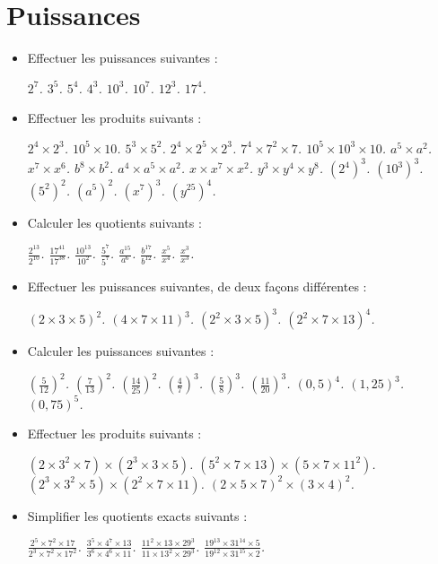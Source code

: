 \chapter{Puissances}
 
 \begin{itemize}
 \item Effectuer les puissances suivantes : \begin{itemize}
 \it $2^7$.
 \it $3^5$. 
 \it $5^4$. 
 \it $4^3$.
 \it $10^3$. 
 \it $10^7$. 
 \it $12^3$. 
 \it $17^4$. 
 \end{itemize}
 \item Effectuer les produits suivants : \begin{itemize}
 \it $2^4\times 2^3$.
 \it $10^5\times 10$. 
 \it $5^3\times 5^2$. 
 \it $2^4\times2^5\times2^3$.
 \it $7^4\times7^2\times7$.
 \it $10^5\times 10^3\times 10$. 
 \it $a^5\times a^2$.  
 \it $x^7\times x^6$. 
 \it $b^8\times b^2$. 
 \it $a^4\times a^5\times a^2$. 
 \it $x\times x^7\times x^2$. 
 \it $y^3\times y^4\times y^8$. 
 \it $(2^4)^3$.
 \it $(10^3)^3$.
 \it $(5^2)^2$. 
 \it $(a^5)^2$.
 \it $(x^7)^3$. 
 \it $(y^{25})^4$.
\end{itemize}  
\item Calculer les quotients suivants : \begin{itemize}
\it $\frac{2^{13}}{2^{10}}$.
\it $\frac{17^{41}}{17^{38}}$.
\it $\frac{10^{13}}{10^2}$. 
\it $\frac{5^7}{5^7}$. 
\it $\frac{a^{15}}{a^6}$.
\it $\frac{b^{17}}{b^{12}}$.
\it $\frac{x^5}{x^4}$. 
\it $\frac{x^3}{x^3}$.
\end{itemize}
\item Effectuer les puissances suivantes, de deux façons différentes : \begin{itemize}
\it $(2\times3\times5)^2$.
\it $(4\times 7\times 11)^3$.
\it $(2^2\times3\times5)^3$.
\it $(2^2\times7\times13)^4$.
\end{itemize}
\item Calculer les puissances suivantes : 
\begin{itemize}
\it $\left(\frac5{12}\right)^2$. 
\it $\left(\frac7{13}\right)^2$. 
\it $\left(\frac{14}{25}\right)^2$. 
\it $\left(\frac47\right)^3$. 
\it $\left(\frac58\right)^3$. 
\it $\left(\frac{11}{20}\right)^3$.
\it $(0,5)^4$. 
\it $(1,25)^3$. 
\it $(0,75)^5$.
\end{itemize}
\item Effectuer les produits suivants : 
\begin{itemize}
\it $(2\times 3^2\times 7)\times (2^3\times 3 \times 5)$.
\it $(5^2\times 7\times 13)\times(5\times 7\times 11^2)$. 
\it $(2^3\times 3^2\times 5) \times ( 2^2\times 7\times 11)$. 
\it $(2\times 5 \times 7)^2\times (3\times 4)^2$.
\end{itemize}
\item Simplifier les quotients exacts suivants : 
\begin{itemize}
\it $\frac{2^5\times7^2\times17}{2^3\times7^2\times17^2}$.
\it $\frac{3^5\times 4^7\times 13}{3^6\times 4^6\times 11}$.
\it $\frac{11^2\times 13\times 29^3}{11\times 13^2\times 29^3}$. 
\it $\frac{19^{13}\times 31^{14} \times 5}{19^{12}\times 31^{15}\times2}$. 
\end{itemize}
 \end{itemize}